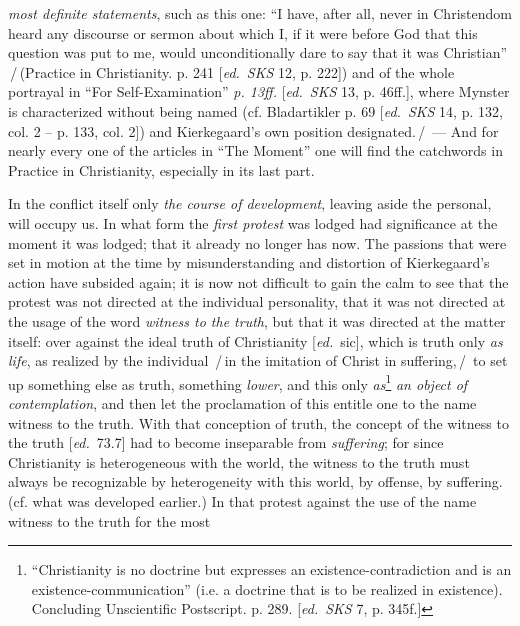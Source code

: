 \documentclass[12pt,a4paper,openany]{book}
\newcommand{\kpage}[1]{\marginnote{\footnotesize\textit{[#1]}}}
\newcommand{\ed}[1]{{\small[\textit{ed.}\ #1]}}
\newcommand{\ins}[1]{\,/\,#1\,/\,}
\begin{document}
\emph{most definite statements}, such as this one: ``I have, after all, never in Christendom heard
any discourse or sermon about which I, if it were before God
that this question was put to me, would unconditionally dare to say that it was
Christian'' \ins{(Practice in Christianity. p. 241 \ed{\emph{SKS} 12, p. 222})
and of the whole portrayal in ``For Self-Examination'' \emph{p. 13ff.} \ed{\emph{SKS} 13, p. 46ff.},
where Mynster is characterized without being named (cf. Bladartikler
p. 69 \ed{\emph{SKS} 14, p. 132, col. 2 -- p. 133, col. 2}) and Kierkegaard's
own position designated.} --- And for nearly every one of the articles in
``The Moment'' one will find the catchwords in Practice in Christianity, especially in its last
part.

In the conflict itself only \emph{the course of development}, leaving aside the
personal, will occupy us. In what form the \emph{first protest} was lodged
had significance at the moment it was lodged; that it already
no longer has now. The passions that were set in motion at the time by
misunderstanding and distortion of Kierkegaard's action have
subsided again; it is now not difficult to gain the calm to see that
the protest was not directed at the individual personality, that it was not directed at
the usage of the word \emph{witness to the truth}, but that it was directed at the matter itself:
over against the ideal truth of Christianity \ed{sic}, which
is truth only \emph{as life}, as realized by the individual \ins{in the imitation of Christ
in suffering,} to set up something else as truth, something \emph{lower}, and this
only \emph{as}\footnote[103]{``Christianity is no doctrine but expresses an existence-contradiction and is
an existence-communication'' (i.e. a doctrine that is to be realized in existence). Concluding
Unscientific Postscript. p. 289. \ed{\emph{SKS} 7, p. 345f.}}
\emph{an object of contemplation}, and then let the proclamation of this
entitle one to the name witness to the truth. With that conception of truth,
the concept of the witness to the truth \ed{73.7} had to become inseparable from
\kpage{160}\emph{suffering}; for since Christianity is heterogeneous with the world, the
witness to the truth must always be recognizable by heterogeneity with
this world, by offense, by suffering. (cf. what was developed earlier.)
In that protest against the use of the name witness to the truth for the most
\end{document}
